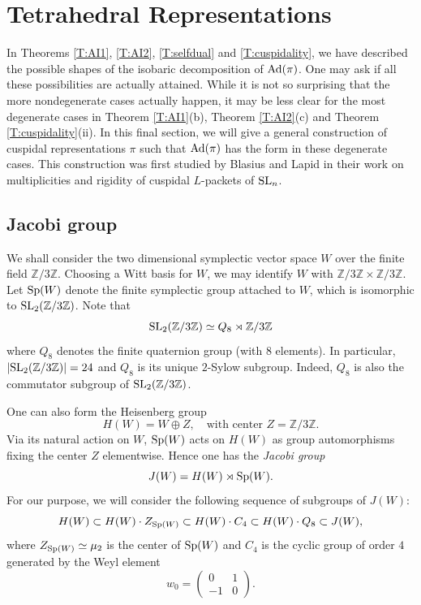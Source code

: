 \documentclass[11pt]{amsart}
\theoremstyle{plain}
\numberwithin{equation}{section}
\newcommand{\Z}{\mathbb Z}
\def\SL{{\rm SL}}
\def\Sp{{\rm Sp}}
\def\Sp{{\rm Sp}}
\def\Z{{\mathbb Z}}
\begin{document}
\section{\bf Tetrahedral Representations} \label{S:artin}
In Theorems \ref{T:AI1}, \ref{T:AI2}, \ref{T:selfdual} and \ref{T:cuspidality},  we have described the possible shapes of the isobaric decomposition of ${\rm Ad}(\pi)$. One may ask if all these possibilities are actually attained. While it is not so surprising that the more nondegenerate cases actually happen, it may be less clear for the most degenerate cases in Theorem \ref{T:AI1}(b), Theorem \ref{T:AI2}(c) and Theorem \ref{T:cuspidality}(ii). In this final section, we will give a general construction of  cuspidal representations $\pi$
such that ${\rm Ad}(\pi)$ has the form in these degenerate cases. This construction was first studied by Blasius \cite{B} and  Lapid \cite[\S 5]{L2} in their work on multiplicities and rigidity of cuspidal $L$-packets of $\SL_n$.
\vskip 5pt

\subsection{\bf Jacobi group}
We shall consider the two dimensional symplectic vector space $W$ over the finite field $\Z/3\Z$. Choosing a Witt basis for $W$, we may identify $W$ with $\Z/3\Z \times \Z/3\Z$. Let $\Sp(W)$ 
denote the finite symplectic group attached to $W$, which is isomorphic to $\SL_2(\Z/3\Z)$. Note that 
\[ \SL_2(\Z/3\Z) \simeq  Q_8 \rtimes \Z/3\Z \]
where $Q_8$ denotes the finite quaternion group (with $8$ elements). 
In particular, $|\SL_2(\Z/3\Z)| = 24$ and $Q_8$ is its unique $2$-Sylow subgroup. Indeed, $Q_8$ is also the commutator subgroup of $\SL_2(\Z/3\Z)$.
\vskip 5pt

One can also form the Heisenberg group
\[ H(W) = W \oplus Z, \quad \text{with center $Z = \Z/3\Z$.} \]
Via its natural action on $W$, $\Sp(W)$ acts on $H(W)$ as group automorphisms fixing the center $Z$ elementwise. Hence one has the {\it Jacobi group}
\[   J(W) = H(W) \rtimes \Sp(W). \]
For our purpose, we will consider the following sequence of subgroups of $J(W)$:
\begin{equation} \label{E:chain}
  H(W) \subset H(W)  \cdot Z_{\Sp(W)}  \subset H(W) \cdot   C_4 \subset  H(W) \cdot Q_8 \subset J(W), \end{equation}
where $Z_{\Sp(W)} \simeq  \mu_2$ is the center of $\Sp(W)$ and $C_4$ is the cyclic group of order $4$ generated by the Weyl element
\[ w_0 = \left( \begin{array}{cc}
0 & 1 \\
-1 & 0 \end{array} \right). \]
\end{document}
